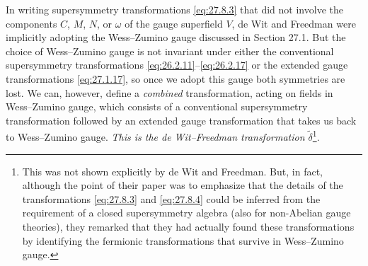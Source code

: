 In writing supersymmetry transformations \eqref{eq:27.8.3} that did not
involve the components \(C\), \(M\), \(N\), or \(\omega\) of the gauge
superfield \(V\), de Wit and Freedman were implicitly adopting the
Wess--Zumino gauge discussed in Section 27.1. But the choice of Wess--Zumino
gauge is not invariant under either the conventional supersymmetry
transformations \eqref{eq:26.2.11}--\eqref{eq:26.2.17} or the extended gauge
transformations \eqref{eq:27.1.17}, so once we adopt this gauge both
symmetries are lost. We can, however, define a \emph{combined}
transformation, acting on fields in Wess--Zumino gauge, which consists of a
conventional supersymmetry transformation followed by an extended gauge
transformation that takes us back to Wess--Zumino gauge. \emph{This is the
de Wit--Freedman transformation \(\widetilde{\delta}\)}\footnote{This was not
shown explicitly by de Wit and Freedman. But, in fact, although the point of
their paper was to emphasize that the details of the transformations
\eqref{eq:27.8.3} and \eqref{eq:27.8.4} could be inferred from the
requirement of a closed supersymmetry algebra (also for non-Abelian gauge
theories), they remarked that they had actually found these transformations
by identifying the fermionic transformations that survive in Wess--Zumino
gauge.}.

